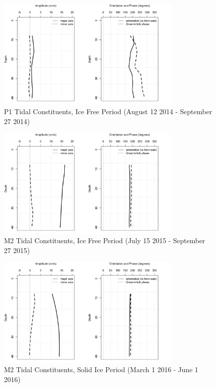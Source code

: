 \documentclass[12pt]{dforeport}
\begin{document}
\begin{figure}  
\centering
\includegraphics[width = 0.8\textwidth]{./figures/52_P1TC_if_2014.png}
\caption[P1 Tidal Constituents, Ice free, 2014]{P1 Tidal Constituents, Ice Free Period (August 12 2014 - September 27 2014)}
\label{f:p1_if_2014}
\end{figure}


\begin{figure}  
\centering
\includegraphics[width = 0.8\textwidth]{./figures/53_M2TC_if_2015.png}
\caption[M2 Tidal Constituents, Ice free, 2015]{M2 Tidal Constituents, Ice Free Period (July 15 2015 - September 27 2015)}
\label{f:m2_if_2015}
\end{figure}

\begin{figure}  
\centering
\includegraphics[width = 0.8\textwidth]{./figures/54_M2TC_si_2015.png}
\caption[M2 Tidal Constituents, Solid Ice, 2015]{M2 Tidal Constituents, Solid Ice Period (March 1 2016 - June 1 2016)}
\label{f:m2_si_2015}
\end{figure}
\end{document}
